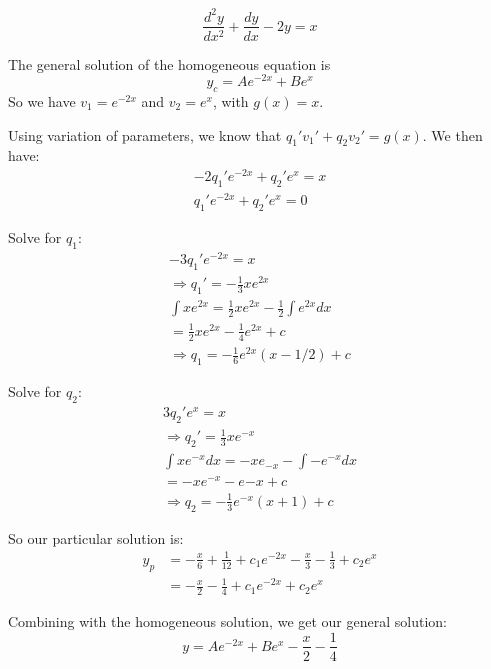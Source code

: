 \documentclass[a4paper,10pt]{article}
\begin{document}
\begin{ex}
	\[
		\frac{d^2y}{dx^2} + \frac{dy}{dx} - 2y = x
	\]

	The general solution of the homogeneous equation is
	\[
		y_c = Ae^{-2x} + Be^x
	\]
	So we have $v_1 = e^{-2x}$ and $v_2 = e^x$, with $g(x) = x$.

	Using variation of parameters, we know that
	$q_1'v_1' + q_2v_2' = g(x)$. We then have:
	\begin{align*}
		-2 q_1' e^{-2x} + q_2' e^x = x \\
		q_1' e^{-2x} + q_2' e^x = 0
	\end{align*}

	Solve for $q_1$:
	\begin{gather*}
		-3q_1'e^{-2x} = x \\
		\Rightarrow q_1' = -\frac{1}{3} xe^{2x} \\
		\int xe^{2x} = \frac{1}{2}xe^{2x} - \frac{1}{2} \int e^{2x} dx \\
		= \frac{1}{2}xe^{2x} - \frac{1}{4}e^{2x} + c \\
		\Rightarrow q_1 = -\frac{1}{6}e^{2x} (x - 1/2) + c
	\end{gather*}

	Solve for $q_2$:
	\begin{gather*}
		3q_2'e^x = x \\
		\Rightarrow q_2' = \frac{1}{3}xe^{-x} \\
		\int xe^{-x} dx = -xe_{-x} - \int -e^{-x} dx \\
		= -xe^{-x} - e{-x} +c \\
		\Rightarrow q_2 = -\frac{1}{3}e^{-x}(x+1) + c
	\end{gather*}

	So our particular solution is:
	\begin{align*}
		y_p &= -\frac{x}{6} + \frac{1}{12} + c_1e^{-2x}
		- \frac{x}{3} - \frac{1}{3} + c_2e^x \\
		&= -\frac{x}{2} - \frac{1}{4} + c_1e^{-2x} + c_2e^x
	\end{align*}

	Combining with the homogeneous solution, we get our general solution:
	\[
		y = Ae^{-2x} + Be^{x} - \frac{x}{2} - \frac{1}{4}
	\]
\end{ex}
\end{document}
